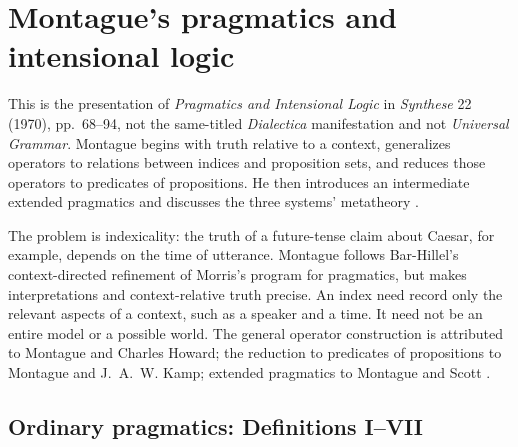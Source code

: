 \section{Montague's pragmatics and intensional logic}
\label{sec:p08-n-b-006-02}

This is the presentation of \emph{Pragmatics and Intensional Logic} in
\emph{Synthese} 22 (1970), pp.~68--94, not the same-titled
\emph{Dialectica} manifestation and not \emph{Universal Grammar}.
Montague begins with truth relative to a context, generalizes operators
to relations between indices and proposition sets, and reduces those
operators to predicates of propositions. He then introduces an
intermediate extended pragmatics and discusses the three systems'
metatheory \cite{Montague1970Pragmatics}.

The problem is indexicality: the truth of a future-tense claim about
Caesar, for example, depends on the time of utterance. Montague follows
Bar-Hillel's context-directed refinement of Morris's program for
pragmatics, but makes interpretations and context-relative truth precise.
An index need record only the relevant aspects of a context, such as a
speaker and a time. It need not be an entire model or a possible world.
The general operator construction is attributed to Montague and Charles
Howard; the reduction to predicates of propositions to Montague and
J.~A.~W. Kamp; extended pragmatics to Montague and Scott
\cite[pp.~68--69,76,82,86; note~12]{Montague1970Pragmatics}.

\subsection{Ordinary pragmatics: Definitions I--VII}

